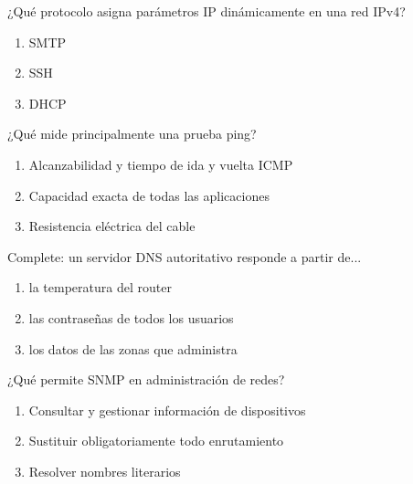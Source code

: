 \noindent\begin{minipage}{\linewidth}\setlength{\parskip}{4pt}\label{q:R-028}
¿Qué protocolo asigna parámetros IP dinámicamente en una red IPv4?
\begin{enumerate}[label=\Alph*),nosep]
\item SMTP
\item SSH
\item DHCP
\end{enumerate}\end{minipage}\par\medskip

\noindent\begin{minipage}{\linewidth}\setlength{\parskip}{4pt}\label{q:R-029}
¿Qué mide principalmente una prueba ping?
\begin{enumerate}[label=\Alph*),nosep]
\item Alcanzabilidad y tiempo de ida y vuelta ICMP
\item Capacidad exacta de todas las aplicaciones
\item Resistencia eléctrica del cable
\end{enumerate}\end{minipage}\par\medskip

\noindent\begin{minipage}{\linewidth}\setlength{\parskip}{4pt}\label{q:R-030}
Complete: un servidor DNS autoritativo responde a partir de...
\begin{enumerate}[label=\Alph*),nosep]
\item la temperatura del router
\item las contraseñas de todos los usuarios
\item los datos de las zonas que administra
\end{enumerate}\end{minipage}\par\medskip

\noindent\begin{minipage}{\linewidth}\setlength{\parskip}{4pt}\label{q:R-031}
¿Qué permite SNMP en administración de redes?
\begin{enumerate}[label=\Alph*),nosep]
\item Consultar y gestionar información de dispositivos
\item Sustituir obligatoriamente todo enrutamiento
\item Resolver nombres literarios
\end{enumerate}\end{minipage}\par\medskip

